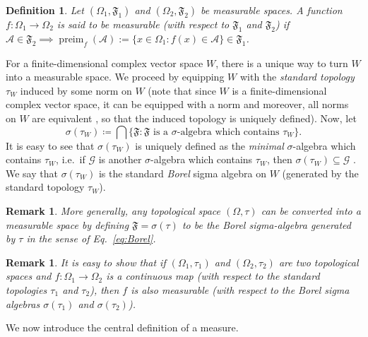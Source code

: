\documentclass[a4paper,onecolumn,10pt,accepted=2022-07-11]{quantumarticle}
\newtheorem{definition}[theorem]{Definition}
\newtheorem{remark}[theorem]{Remark}
\theoremstyle{definition}
\begin{document}
\begin{definition}
Let $(\Omega_1,\mathfrak{F}_1)$ and $(\Omega_2,\mathfrak{F}_2)$ be measurable spaces. A function $f:\Omega_1\to \Omega_2$ is said to be \emph{measurable} (with respect to $\mathfrak{F}_1$ and $\mathfrak{F}_2$) if $\mathcal{A}\in\mathfrak{F}_2 \implies \operatorname{preim}_{f}(\mathcal{A}):= \{x\in \Omega_1 : f(x)\in \mathcal{A} \} \in \mathfrak{F}_1$.
\end{definition}

For a finite-dimensional complex vector space $W$, there is a unique way to turn $W$ into a measurable space. We proceed by equipping $W$ with the \emph{standard topology} $\tau_{W}$ induced by some norm on $W$ (note that since $W$ is a finite-dimensional complex vector space, it can be equipped with a norm and moreover, all norms on $W$ are equivalent \cite[Theorem 3.1]{Conway1994anal}, so that the induced topology is uniquely defined). Now, let 
\begin{equation}\label{eq:Borel}
    \sigma (\tau_{W}) \coloneqq \bigcap \{\mathfrak{F} : \mathfrak{F} \text{ is a } \sigma\text{-algebra which contains } \tau_{W} \}.
\end{equation}
It is easy to see that $\sigma(\tau_{W})$ is uniquely defined as the \emph{minimal} $\sigma$-algebra which contains $\tau_{W}$, i.e.~if $\mathcal{G}$ is another $\sigma$-algebra which contains $\tau_{W}$, then $\sigma (\tau_{W}) \subseteq \mathcal{G}$ \cite[Theorem 5.2.1]{edgar2008measure}. We say that $\sigma(\tau_{W})$ is the standard \emph{Borel} sigma algebra on $W$ (generated by the standard topology $\tau_{W}$). 

\begin{remark}
More generally, any topological space $(\Omega,\tau)$ can be converted into a measurable space by defining $\mathfrak{F}=\sigma(\tau)$ to be the \emph{Borel} sigma-algebra generated by $\tau$ in the sense of Eq.~\eqref{eq:Borel}.
\end{remark}

\begin{remark}
It is easy to show that if $(\Omega_1,\tau_1)$ and $(\Omega_2,\tau_2)$ are two topological spaces and $f:\Omega_1\to \Omega_2$ is a continuous map (with respect to the standard topologies $\tau_1$ and $\tau_2$), then $f$ is also measurable (with respect to the Borel sigma algebras $\sigma(\tau_1)$ and $\sigma(\tau_2)$).
\end{remark}

We now introduce the central definition of a measure.
\end{document}
